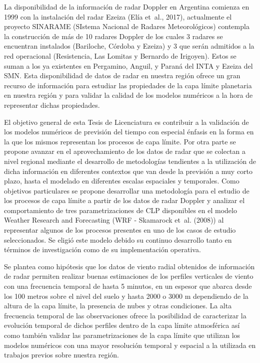 \documentclass[12pt,spanish,oneside, a4paper]{book}
\begin{document}
La disponibilidad de la información de radar Doppler en Argentina
comienza en 1999 con la instalación del radar Ezeiza (Elía et~al.,
2017), actualmente el proyecto SINARAME (SIstema Nacional de Radares
Meteorológicos) contempla la construcción de más de 10 radares Doppler
de los cuales 3 radares se encuentran instalados (Bariloche, Córdoba y
Ezeiza) y 3 que serán admitidos a la red operacional (Resistencia, Las
Lomitas y Bernardo de Irigoyen). Estos se suman a los ya existentes en
Pergamino, Anguil, y Paraná del INTA y Ezeiza del SMN. Esta
disponibilidad de datos de radar en nuestra región ofrece un gran
recurso de información para estudiar las propiedades de la capa límite
planetaria en nuestra región y para validar la calidad de los modelos
numéricos a la hora de representar dichas propiedades.

El objetivo general de esta Tesis de Licenciatura es contribuir a la
validación de los modelos numéricos de previsión del tiempo con especial
énfasis en la forma en la que los mismos representan los procesos de
capa límite. Por otra parte se propone avanzar en el aprovechamiento de
los datos de radar que se colectan a nivel regional mediante el
desarrollo de metodologías tendientes a la utilización de dicha
información en diferentes contextos que van desde la previsión a muy
corto plazo, hasta el modelado en diferentes escalas espaciales y
temporales. Como objetivos particulares se propone desarrollar una
metodología para el estudio de los procesos de capa límite a partir de
los datos de radar Doppler y analizar el comportamiento de tres
parametrizaciones de CLP disponibles en el modelo Weather Research and
Forecasting (WRF - Skamarock et~al. (2008)) al representar algunos de
los procesos presentes en uno de los casos de estudio seleccionados. Se
eligió este modelo debido su continuo desarrollo tanto en términos de
investigación como de su implementación operativa.

Se plantea como hipótesis que los datos de viento radial obtenidos de
información de radar permiten realizar buenas estimaciones de los
perfiles verticales de viento con una frecuencia temporal de hasta 5
minutos, en un espesor que abarca desde los 100 metros sobre el nivel
del suelo y hasta 2000 o 3000 m dependiendo de la altura de la capa
límite, la presencia de nubes y otras condiciones. La alta frecuencia
temporal de las observaciones ofrece la posibilidad de caracterizar la
evolución temporal de dichos perfiles dentro de la capa límite
atmosférica así como también validar las parametrizaciones de la capa
límite que utilizan los modelos numéricos con una mayor resolución
temporal y espacial a la utilizada en trabajos previos sobre nuestra
región.
\end{document}
